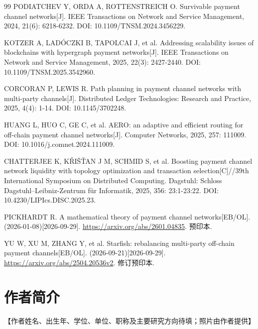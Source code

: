 \documentclass[UTF8,a4paper,twocolumn,fontset=none,zihao=5]{ctexart}
\begin{document}
\begin{thebibliography}{99}
 PODIATCHEV Y, ORDA A, ROTTENSTREICH O. Survivable payment channel networks[J]. IEEE Transactions on Network and Service Management, 2024, 21(6): 6218-6232. DOI: 10.1109/TNSM.2024.3456229.

 KOTZER A, LADÓCZKI B, TAPOLCAI J, et al. Addressing scalability issues of blockchains with hypergraph payment networks[J]. IEEE Transactions on Network and Service Management, 2025, 22(3): 2427-2440. DOI: 10.1109/TNSM.2025.3542960.

 CORCORAN P, LEWIS R. Path planning in payment channel networks with multi-party channels[J]. Distributed Ledger Technologies: Research and Practice, 2025, 4(4): 1-14. DOI: 10.1145/3702248.

 HUANG L, HUO C, GE C, et al. AERO: an adaptive and efficient routing for off-chain payment channel networks[J]. Computer Networks, 2025, 257: 111009. DOI: 10.1016/j.comnet.2024.111009.

 CHATTERJEE K, KŘIŠŤAN J M, SCHMID S, et al. Boosting payment channel network liquidity with topology optimization and transaction selection[C]//39th International Symposium on Distributed Computing. Dagstuhl: Schloss Dagstuhl–Leibniz-Zentrum für Informatik, 2025, 356: 23:1-23:22. DOI: 10.4230/LIPIcs.DISC.2025.23.

 PICKHARDT R. A mathematical theory of payment channel networks[EB/OL]. (2026-01-08)[2026-09-29]. \url{https://arxiv.org/abs/2601.04835}. 预印本.

 YU W, XU M, ZHANG Y, et al. Starfish: rebalancing multi-party off-chain payment channels[EB/OL]. (2026-09-21)[2026-09-29]. \url{https://arxiv.org/abs/2504.20536v2}. 修订预印本.

\end{thebibliography}\section*{作者简介}

【作者姓名、出生年、学位、单位、职称及主要研究方向待填；照片由作者提供】
\end{document}

